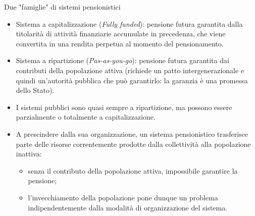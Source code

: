 \documentclass[aspectratio=64,12pt]{beamer}
\begin{document}
\begin{frame}{Due "famiglie" di sistemi pensionistici}
\begin{itemize}
\item \alert{Sistema a capitalizzazione} (\emph{Fully funded}): pensione futura garantita
dalla titolarità di attività finanziarie accumulate in precedenza, che viene
convertita in una rendita perpetua al momento del pensionamento.
\item \alert{Sistema a ripartizione} (\emph{Pas-as-you-go}): pensione futura garantita dai
contributi della popolazione attiva (richiede un patto intergenerazionale e
quindi un'autorità pubblica che può garantirlo: la garanzia è una promessa
dello Stato).
\item I sistemi pubblici sono quasi sempre a ripartizione, ma possono essere
  parzialmente o totalmente a capitalizzazione.
\item A prescindere dalla sua organizzazione, un sistema pensionistico
  trasferisce parte delle risorse correntemente prodotte dalla collettività
  alla popolazione inattiva:
\begin{itemize}
\item senza il contributo della popolazione attiva, impossibile garantire la
  pensione;
\item l'invecchiamento della popolazione pone dunque un problema
  indipendentemente dalla modalità di organizzazione del sistema.
\end{itemize}
\end{itemize}
\end{frame}
\end{document}
